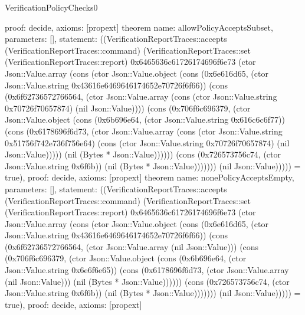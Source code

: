 \begin{lexlean}{VerificationPolicyChecks0}
\begin{semanticmodule}
{  proof: decide{},
  axioms: [propext]
}
theorem{
  name: allowPolicyAcceptsSubset,
  parameters: [],
  statement: ((VerificationReportTraces::accepts (VerificationReportTraces::command) (VerificationReportTraces::set (VerificationReportTraces::report) 0x6465636c61726174696f6e73 (ctor Json::Value.array (cons (ctor Json::Value.object (cons (0x6e616d65, (ctor Json::Value.string 0x43616e6469646174652e70726f6f66)) (cons (0x6f62736572766564, (ctor Json::Value.array (cons (ctor Json::Value.string 0x70726f70657874) (nil Json::Value)))) (cons (0x706f6c696379, (ctor Json::Value.object (cons (0x6b696e64, (ctor Json::Value.string 0x616c6c6f77)) (cons (0x6178696f6d73, (ctor Json::Value.array (cons (ctor Json::Value.string 0x51756f742e736f756e64) (cons (ctor Json::Value.string 0x70726f70657874) (nil Json::Value))))) (nil (Bytes * Json::Value)))))) (cons (0x726573756c74, (ctor Json::Value.string 0x6f6b)) (nil (Bytes * Json::Value))))))) (nil Json::Value))))) = true),
  proof: decide{},
  axioms: [propext]
}
theorem{
  name: nonePolicyAcceptsEmpty,
  parameters: [],
  statement: ((VerificationReportTraces::accepts (VerificationReportTraces::command) (VerificationReportTraces::set (VerificationReportTraces::report) 0x6465636c61726174696f6e73 (ctor Json::Value.array (cons (ctor Json::Value.object (cons (0x6e616d65, (ctor Json::Value.string 0x43616e6469646174652e70726f6f66)) (cons (0x6f62736572766564, (ctor Json::Value.array (nil Json::Value))) (cons (0x706f6c696379, (ctor Json::Value.object (cons (0x6b696e64, (ctor Json::Value.string 0x6e6f6e65)) (cons (0x6178696f6d73, (ctor Json::Value.array (nil Json::Value))) (nil (Bytes * Json::Value)))))) (cons (0x726573756c74, (ctor Json::Value.string 0x6f6b)) (nil (Bytes * Json::Value))))))) (nil Json::Value))))) = true),
  proof: decide{},
  axioms: [propext]
}
\end{semanticmodule}
\end{lexlean}
